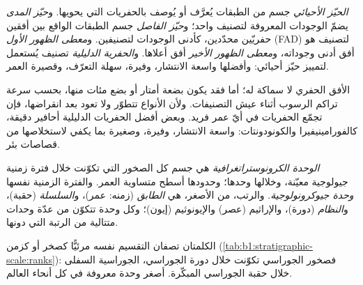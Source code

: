 \begin{definition}\label{def:b1:stratigraphic-scale:biozone}
\emph{الحيّز الأحيائي} جسم من الطبقات يُعرَّف أو يُوصف بالحفريات التي يحويها. و\emph{حيّز المدى} يضمّ الوجودات المعروفة لتصنيف واحد؛ و\emph{حيّز الفاصل} جسم الطبقات الواقع بين أفقين حفريّين محدّدين، كأدنى الوجودات لتصنيفين. و\emph{معطى الظهور الأول} (FAD) لتصنيف هو أفق أدنى وجوداته، و\emph{معطى الظهور الأخير} أفق أعلاها. و\emph{الحفرية الدليلية} تصنيف يُستعمل لتمييز حيّز أحيائي: وأفضلها واسعة الانتشار، وفيرة، سهلة التعرّف، وقصيرة العمر.
\end{definition}

الأفق الحفري لا سماكة له؛ أما  فقد يكون بضعة أمتار أو بضع مئات منها، بحسب سرعة تراكم الرسوب أثناء عيش التصنيفات. ولأن الأنواع تتطوّر ولا تعود بعد انقراضها، فإن تجمّع الحفريات في أيّ عمر فريد. وبعض أفضل الحفريات الدليلية أحافير دقيقة، كالفورامينيفيرا والكونودونتات: واسعة الانتشار، وفيرة، وصغيرة بما يكفي لاستخلاصها من قصاصات بئر.

\begin{definition}\label{def:b1:stratigraphic-scale:chronostratigraphy}
\emph{الوحدة الكرونوستراتغرافية} هي جسم كل الصخور التي تكوّنت خلال فترة زمنية جيولوجية معيّنة، وخلالها وحدها؛ وحدودها أسطح متساوية العمر. والفترة الزمنية نفسها \emph{وحدة جيوكرونولوجية}. والرتب، من الأصغر، هي \emph{الطابق} (زمنه: عمر)، و\emph{السلسلة} (حقبة)، و\emph{النظام} (دورة)، والإراثيم (عصر) والإيونوثيم (إيون)؛ وكل وحدة تتكوّن من عدّة وحدات متتالية من الرتبة التي دونها.
\end{definition}

الكلمتان تصفان التقسيم نفسه مرئيًّا كصخر أو كزمن (\cref{tab:b1:stratigraphic-scale:ranks}): فصخور الجوراسي تكوّنت خلال دورة الجوراسي،  الجوراسية السفلى خلال حقبة الجوراسي المبكّرة.  أصغر وحدة معروفة في كل أنحاء العالم.

